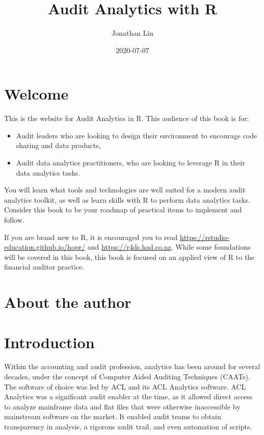 \documentclass[
]{book}
\title{Audit Analytics with R}
\author{Jonathan Lin}
\date{2020-07-07}
\providecommand{\tightlist}{%
  \setlength{\itemsep}{0pt}\setlength{\parskip}{0pt}}
\begin{document}
\maketitle

{
\setcounter{tocdepth}{1}
\tableofcontents
}
\hypertarget{welcome}{%
\chapter*{Welcome}\label{welcome}}

This is the website for Audit Analytics in R. This audience of this book is for:

\begin{itemize}
\tightlist
\item
  Audit leaders who are looking to design their environment to encourage code sharing and data products,
\item
  Audit data analytics practitioners, who are looking to leverage R in their data analytics tasks.
\end{itemize}

You will learn what tools and technologies are well suited for a modern audit analytics toolkit, as well as learn skills with R to perform data analytics tasks. Consider this book to be your roadmap of practical items to implement and follow.

If you are brand new to R, it is encouraged you to read \url{https://rstudio-education.github.io/hopr/} and \url{https://r4ds.had.co.nz}. While some foundations will be covered in this book, this book is focused on an applied view of R to the financial auditor practice.

\hypertarget{about-the-author}{%
\chapter*{About the author}\label{about-the-author}}

\hypertarget{intro}{%
\chapter{Introduction}\label{intro}}

Within the accounting and audit profession, analytics has been around for several decades, under the concept of Computer Aided Auditing Techniques (CAATs). The software of choice was led by ACL and its ACL Analytics software. ACL Analytics was a significant audit enabler at the time, as it allowed direct access to analyze mainframe data and flat files that were otherwise inaccessible by mainstream software on the market. It enabled audit teams to obtain transparency in analysis, a rigorous audit trail, and even automation of scripts.
\end{document}
